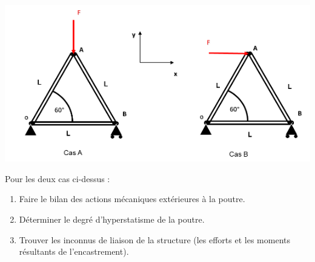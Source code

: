 \documentclass[lecture.tex]{subfiles}
\begin{document}
\exercice{}


\begin{center}
  \includegraphics[scale=0.5]{exo-treillis-3-barres.png}
\end{center}

Pour les deux cas ci-dessus :

\begin{enumerate}
  \item Faire le bilan des actions mécaniques extérieures à la poutre.
  \item Déterminer le degré d’hyperstatisme de la poutre.
  \item Trouver les inconnus de liaison de la structure (les efforts et les moments résultants de l’encastrement).
\end{enumerate}

\finexercice
\end{document}
